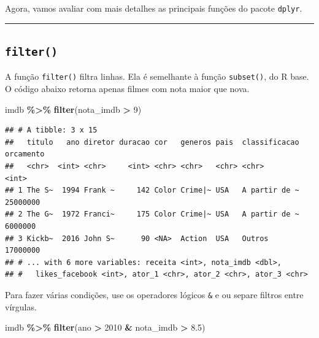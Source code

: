 \documentclass[
]{book}
\newenvironment{Shaded}{\begin{snugshade}}{\end{snugshade}}
\newcommand{\DecValTok}[1]{\textcolor[rgb]{0.00,0.00,0.81}{#1}}
\newcommand{\FloatTok}[1]{\textcolor[rgb]{0.00,0.00,0.81}{#1}}
\newcommand{\KeywordTok}[1]{\textcolor[rgb]{0.13,0.29,0.53}{\textbf{#1}}}
\newcommand{\NormalTok}[1]{#1}
\newcommand{\OperatorTok}[1]{\textcolor[rgb]{0.81,0.36,0.00}{\textbf{#1}}}
\newcommand{\StringTok}[1]{\textcolor[rgb]{0.31,0.60,0.02}{#1}}
\begin{document}
Agora, vamos avaliar com mais detalhes as principais funções do pacote \texttt{dplyr}.

\begin{center}\rule{0.5\linewidth}{0.5pt}\end{center}

\hypertarget{filter}{%
\subsection{\texorpdfstring{\texttt{filter()}}{filter()}}\label{filter}}

A função \texttt{filter()} filtra linhas. Ela é semelhante à função \texttt{subset()}, do R base. O código abaixo retorna apenas filmes com nota maior que nova.

\begin{Shaded}
\begin{Highlighting}[]
\NormalTok{imdb }\OperatorTok{\%>\%}
\StringTok{  }\KeywordTok{filter}\NormalTok{(nota\_imdb }\OperatorTok{>}\StringTok{ }\DecValTok{9}\NormalTok{)}
\end{Highlighting}
\end{Shaded}

\begin{verbatim}
## # A tibble: 3 x 15
##   titulo   ano diretor duracao cor   generos pais  classificacao orcamento
##   <chr>  <int> <chr>     <int> <chr> <chr>   <chr> <chr>             <int>
## 1 The S~  1994 Frank ~     142 Color Crime|~ USA   A partir de ~  25000000
## 2 The G~  1972 Franci~     175 Color Crime|~ USA   A partir de ~   6000000
## 3 Kickb~  2016 John S~      90 <NA>  Action  USA   Outros         17000000
## # ... with 6 more variables: receita <int>, nota_imdb <dbl>,
## #   likes_facebook <int>, ator_1 <chr>, ator_2 <chr>, ator_3 <chr>
\end{verbatim}

Para fazer várias condições, use os operadores lógicos \texttt{\&} e \texttt{\textbar{}} ou separe filtros entre vírgulas.

\begin{Shaded}
\begin{Highlighting}[]
\NormalTok{imdb }\OperatorTok{\%>\%}
\StringTok{  }\KeywordTok{filter}\NormalTok{(ano }\OperatorTok{>}\StringTok{ }\DecValTok{2010} \OperatorTok{\&}\StringTok{ }\NormalTok{nota\_imdb }\OperatorTok{>}\StringTok{ }\FloatTok{8.5}\NormalTok{)}
\end{Highlighting}
\end{Shaded}
\end{document}
